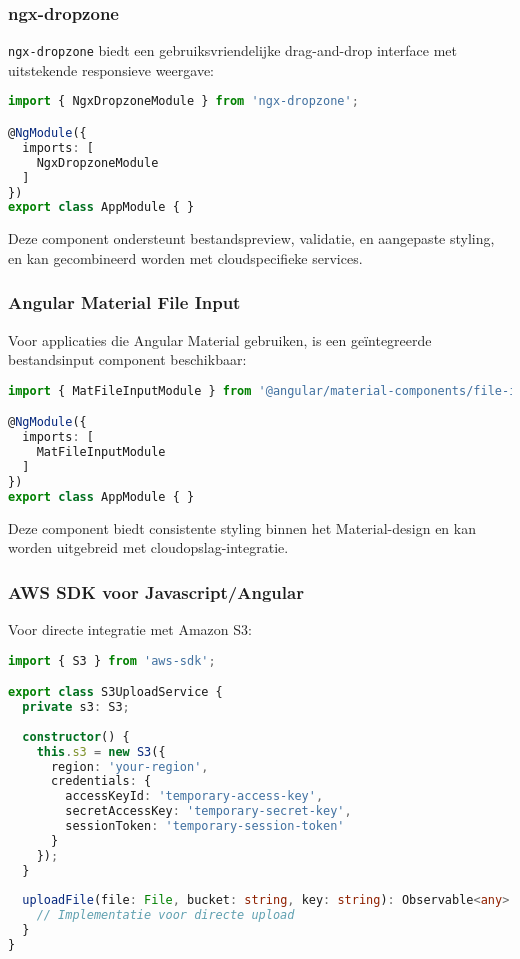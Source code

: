 \subsubsection{ngx-dropzone}

\texttt{ngx-dropzone} biedt een gebruiksvriendelijke drag-and-drop interface met uitstekende responsieve weergave:

\begin{lstlisting}[language=TypeScript, caption=Integratie van ngx-dropzone]
import { NgxDropzoneModule } from 'ngx-dropzone';

@NgModule({
  imports: [
    NgxDropzoneModule
  ]
})
export class AppModule { }
\end{lstlisting}

Deze component ondersteunt bestandspreview, validatie, en aangepaste styling, en kan gecombineerd worden met cloudspecifieke services.

\subsubsection{Angular Material File Input}

Voor applicaties die Angular Material gebruiken, is een geïntegreerde bestandsinput component beschikbaar:

\begin{lstlisting}[language=TypeScript, caption=Integratie van Angular Material File Input]
import { MatFileInputModule } from '@angular/material-components/file-input';

@NgModule({
  imports: [
    MatFileInputModule
  ]
})
export class AppModule { }
\end{lstlisting}

Deze component biedt consistente styling binnen het Material-design en kan worden uitgebreid met cloudopslag-integratie.

\subsubsection{AWS SDK voor Javascript/Angular}

Voor directe integratie met Amazon S3:

\begin{lstlisting}[language=TypeScript, caption=AWS SDK voor directe S3-integratie]
import { S3 } from 'aws-sdk';

export class S3UploadService {
  private s3: S3;
  
  constructor() {
    this.s3 = new S3({
      region: 'your-region',
      credentials: {
        accessKeyId: 'temporary-access-key',
        secretAccessKey: 'temporary-secret-key',
        sessionToken: 'temporary-session-token'
      }
    });
  }
  
  uploadFile(file: File, bucket: string, key: string): Observable<any> {
    // Implementatie voor directe upload
  }
}
\end{lstlisting}


